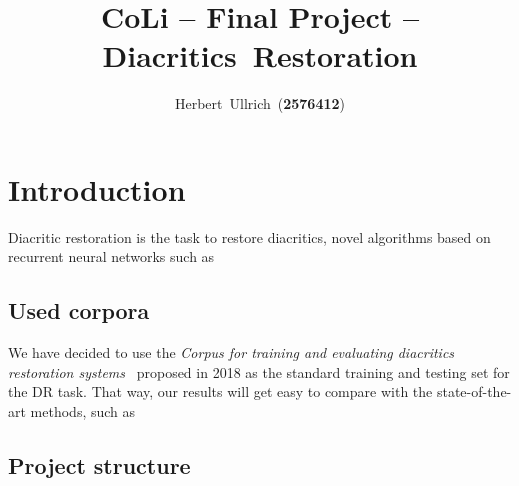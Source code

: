 \documentclass[12pt]{article}
\begin{document}
    \title{CoLi -- Final Project -- Diacritics~Restoration}
    \author{Herbert~Ullrich~(\textbf{2576412})}
    \maketitle
    \section{Introduction}
    Diacritic restoration is the task to restore diacritics, novel algorithms based on recurrent neural networks
    such as~\cite{naplava}
    \subsection{Used corpora}
    We have decided to use the \textit{Corpus for training and evaluating diacritics restoration systems}~\cite{corpus} proposed
    in 2018 as the standard training and testing set for the DR task.
    That way, our results will get easy to compare with the state-of-the-art methods, such as~\cite{naplava}
    \subsection{Project structure}
\end{document}
